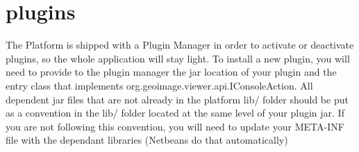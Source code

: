 \documentclass[12pt,a4paper,final,makeidx]{report}
\begin{document}
\section{plugins}
The Platform is shipped with a Plugin Manager in order to activate or deactivate plugins, so the whole application will stay light.
To install a new plugin, you will need to provide to the plugin manager the jar location of your plugin and the entry class that implements org.geoimage.viewer.api.IConsoleAction.
All dependent jar files that are not already in the platform lib/ folder should be put as a convention in the lib/ folder located at the same level of your plugin jar.
If you are not following this convention, you will need to update your META-INF file with the dependant libraries (Netbeans do that automatically)
\end{document}
